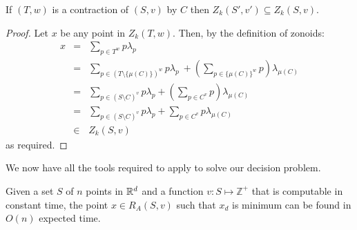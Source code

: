 \documentclass[lotsofwhite]{patmorin}
\begin{document}
\begin{lem}
If $(T,w)$ is a contraction of $(S,v)$ by $C$ then $Z_k(S',v')
\subseteq Z_k(S,v)$.
\end{lem}

\begin{proof}
Let $x$ be any point in $Z_k(T,w)$.  Then, by the definition of
zonoids:
\begin{eqnarray*}
    x &=& \sum_{p\in T^w} p\lambda_p \\
      &=& \sum_{p\in (T\setminus \{\mu(C)\})^w} p\lambda_p\
          + \left(\sum_{p\in \{\mu(C)\}^w}p\right)\lambda_{\mu(C)} \\
      &=& \sum_{p\in (S\setminus C)^v} p\lambda_p
          + \left(\sum_{p\in C^v} p\right)
             \lambda_{\mu(C)}\\
      &=& \sum_{p\in (S\setminus C)^v} p\lambda_p
          + \sum_{p\in C^v} p
             \lambda_{\mu(C)}\\
      &\in& Z_k(S,v)
\end{eqnarray*}
as required.
\end{proof}



We now have all the tools required to apply  to solve our
decision problem.

\begin{thm}
Given a set $S$ of $n$ points in $\mathbb{R}^d$ and a 
function $v:S\mapsto\mathbb{Z}^+$ that is computable in constant
time, the point $x\in R_A(S,v)$ such
that $x_d$ is minimum can be found in $O(n)$ expected
time.
\end{thm}
\end{document}
